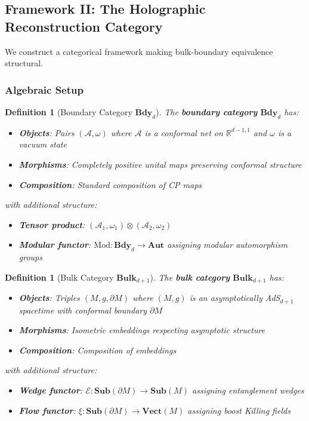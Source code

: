 \documentclass[12pt,a4paper]{article}
\newtheorem{definition}[theorem]{Definition}
\begin{document}
\subsection{Framework II: The Holographic Reconstruction Category}

We construct a categorical framework making bulk-boundary equivalence structural.

\subsubsection{Algebraic Setup}

\begin{definition}[Boundary Category $\mathbf{Bdy}_d$]\label{def:bdy-cat}
The \textbf{boundary category} $\mathbf{Bdy}_d$ has:
\begin{itemize}
    \item \textbf{Objects}: Pairs $(\mathcal{A}, \omega)$ where $\mathcal{A}$ is a conformal net on $\mathbb{R}^{d-1,1}$ and $\omega$ is a vacuum state
    \item \textbf{Morphisms}: Completely positive unital maps preserving conformal structure
    \item \textbf{Composition}: Standard composition of CP maps
\end{itemize}
with additional structure:
\begin{itemize}
    \item \textbf{Tensor product}: $(\mathcal{A}_1, \omega_1) \otimes (\mathcal{A}_2, \omega_2)$
    \item \textbf{Modular functor}: $\text{Mod}: \mathbf{Bdy}_d \to \mathbf{Aut}$ assigning modular automorphism groups
\end{itemize}
\end{definition}

\begin{definition}[Bulk Category $\mathbf{Bulk}_{d+1}$]\label{def:bulk-cat}
The \textbf{bulk category} $\mathbf{Bulk}_{d+1}$ has:
\begin{itemize}
    \item \textbf{Objects}: Triples $(M, g, \partial M)$ where $(M, g)$ is an asymptotically AdS$_{d+1}$ spacetime with conformal boundary $\partial M$
    \item \textbf{Morphisms}: Isometric embeddings respecting asymptotic structure
    \item \textbf{Composition}: Composition of embeddings
\end{itemize}
with additional structure:
\begin{itemize}
    \item \textbf{Wedge functor}: $\mathcal{E}: \mathbf{Sub}(\partial M) \to \mathbf{Sub}(M)$ assigning entanglement wedges
    \item \textbf{Flow functor}: $\xi: \mathbf{Sub}(\partial M) \to \mathbf{Vect}(M)$ assigning boost Killing fields
\end{itemize}
\end{definition}
\end{document}

